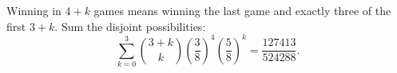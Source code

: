 Winning in $4+k$ games means winning the last game and exactly three of the first $3+k$. Sum the disjoint possibilities:
\[\sum_{k=0}^3\binom{3+k}{k}\left(\dfrac{3}{8}\right)^4\left(\dfrac{5}{8}\right)^k=\boxed{\dfrac{127413}{524288}}.\]

